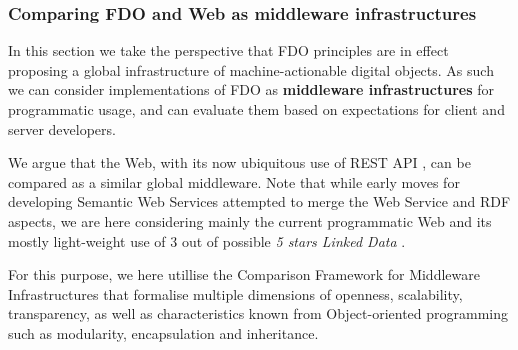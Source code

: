 \hypertarget{ch3:middleware}{%
\subsubsection{Comparing FDO and Web as middleware infrastructures}\label{ch3:middleware}}

In this section we take the perspective that FDO principles are in effect proposing a global infrastructure of machine-actionable digital objects. As such we can consider implementations of FDO as \textbf{middleware infrastructures} for programmatic usage, and can evaluate them based on expectations for client and server developers.

We argue that the Web, with its now ubiquitous use of REST API \cite{fieldingArchitecturalStylesDesign2000a}, can be compared as a similar global middleware. Note that while early moves for developing Semantic Web Services \cite{fenselSemanticWebServices2011} attempted to merge the Web Service and RDF aspects, we are here considering mainly the current programmatic Web and its mostly light-weight use of 3 out of possible \emph{5 stars Linked Data} \cite{OpenData}.

For this purpose, we here utillise the Comparison Framework for Middleware Infrastructures \cite{zarrasComparisonFrameworkMiddleware2004a} that formalise multiple dimensions of openness, scalability, transparency, as well as characteristics known from Object-oriented programming such as modularity, encapsulation and inheritance.

